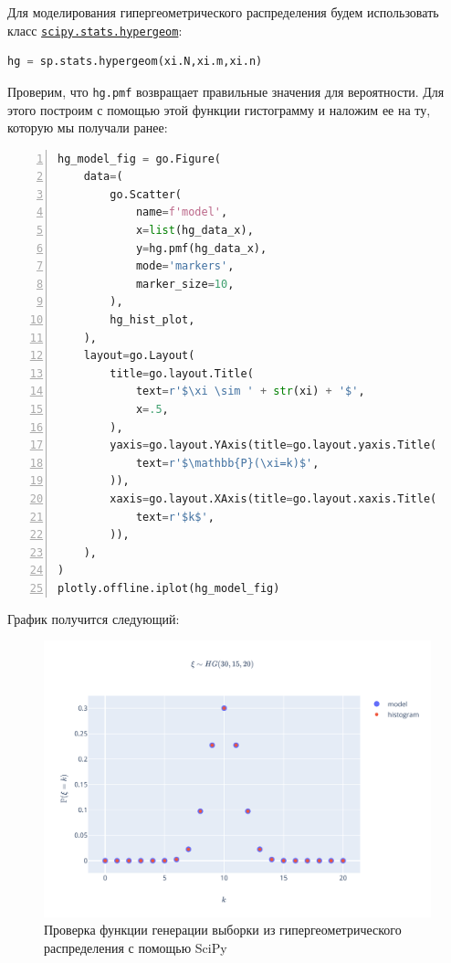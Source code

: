 \documentclass[
  russian,
  a4paper,
]{article}
\newcommand{\passthrough}[1]{#1}
\begin{document}
Для моделирования гипергеометрического распределения будем использовать
класс
\href{https://docs.scipy.org/doc/scipy/reference/generated/scipy.stats.hypergeom.html}{\passthrough{\lstinline!scipy.stats.hypergeom!}}:

\begin{lstlisting}[language=Python]
hg = sp.stats.hypergeom(xi.N,xi.m,xi.n)
\end{lstlisting}

Проверим, что \passthrough{\lstinline!hg.pmf!} возвращает правильные
значения для вероятности. Для этого построим с помощью этой функции
гистограмму и наложим ее на ту, которую мы получали ранее:

\begin{lstlisting}[language=Python, numbers=left]
hg_model_fig = go.Figure(
    data=(
        go.Scatter(
            name=f'model',
            x=list(hg_data_x),
            y=hg.pmf(hg_data_x),
            mode='markers',
            marker_size=10,
        ),
        hg_hist_plot,
    ),
    layout=go.Layout(
        title=go.layout.Title(
            text=r'$\xi \sim ' + str(xi) + '$',
            x=.5,
        ),
        yaxis=go.layout.YAxis(title=go.layout.yaxis.Title(
            text=r'$\mathbb{P}(\xi=k)$',
        )),
        xaxis=go.layout.XAxis(title=go.layout.xaxis.Title(
            text=r'$k$',
        )),
    ),
)
plotly.offline.iplot(hg_model_fig)
\end{lstlisting}

График получится следующий:

\begin{figure}
\centering
\includegraphics{../assets/hg_model_fig.svg}
\caption{Проверка функции генерации выборки из гипергеометрического
распределения с помощью SciPy}
\end{figure}
\end{document}

